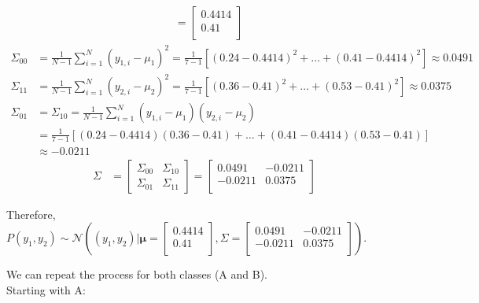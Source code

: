\documentclass[12pt]{article}
\begin{document}
\begin{enumerate}[leftmargin=\labelsep]
\begin{enumerate}
$$\begin{aligned}
                      & = \begin{bmatrix}0.4414 \\0.41 \\\end{bmatrix}
              \end{aligned}
          $$
          $$
              \begin{aligned}
                  \Sigma_{00} & = \frac{1}{N-1} \sum^{N}_{i=1} (y_{1,i} - \mu_{1})^2 = \frac{1}{7-1} \left[(0.24-0.4414)^2 + \dots + (0.41-0.4414)^2\right] \approx 0.0491 \\
                  \Sigma_{11} & = \frac{1}{N-1} \sum^{N}_{i=1} (y_{2,i} - \mu_{2})^2 = \frac{1}{7-1} \left[(0.36-0.41)^2 + \dots + (0.53-0.41)^2\right] \approx 0.0375 \\
                  \Sigma_{01} & = \Sigma_{10} = \frac{1}{N-1} \sum^{N}_{i=1} (y_{1,i} - \mu_{1})(y_{2,i} - \mu_{2}) \\
                              & = \frac{1}{7-1} \left[(0.24-0.4414)(0.36-0.41) + \dots + (0.41-0.4414)(0.53-0.41)\right] \\
                              & \approx -0.0211
              \end{aligned}
          $$
          $$
              \begin{aligned}
                  \Sigma & = \begin{bmatrix}\Sigma_{00} & \Sigma_{10}\\ \Sigma_{01} & \Sigma_{11}\end{bmatrix} = \begin{bmatrix}0.0491 & -0.0211 \\-0.0211 & 0.0375 \\\end{bmatrix}
              \end{aligned}
          $$

          Therefore, $P(y_1, y_2) \sim \mathcal{N}\left((y_1, y_2) | \boldsymbol{\mu} = \begin{bmatrix}0.4414 \\0.41 \\\end{bmatrix},
              \Sigma = \begin{bmatrix}0.0491 & -0.0211 \\-0.0211 & 0.0375 \\\end{bmatrix}\right)$.

          We can repeat the process for both classes (A and B).\\
          Starting with A:


\end{enumerate}
\end{enumerate}
\end{document}
